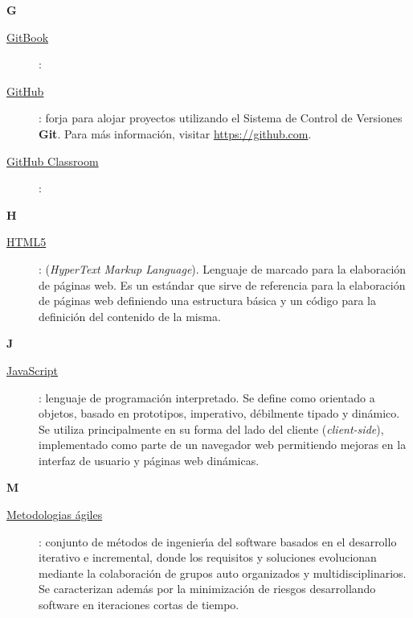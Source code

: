 {\bfseries {\Huge G}}\label{Apendice1:G}
\bigskip
\bigskip

\begin{description}
  \item[\underline{GitBook}\label{apend1:gitbook}]: 
  \bigskip
\end{description}

\begin{description}
  \item[\underline{GitHub}\label{apend1:github}]: forja para alojar proyectos utilizando el Sistema de Control de Versiones {\bfseries Git}. Para m\'as informaci\'on, visitar {\small 
  \url{https://github.com}}.
  \bigskip
\end{description}

\begin{description}
  \item[\underline{GitHub Classroom}\label{apend1:github-classroom}]:
  \bigskip
\end{description}

\bigskip
{\bfseries {\Huge H}}\label{Apendice1:H}
\bigskip
\bigskip

\begin{description}
  \item[\underline{HTML5}\label{apend1:html}]: (\textit{HyperText Markup Language}). Lenguaje de marcado para la elaboraci\'on de p\'aginas web. Es un est\'andar que sirve de referencia para la 
  elaboraci\'on de p\'aginas web definiendo una estructura b\'asica y un c\'odigo para la definici\'on del contenido de la misma.
  \bigskip
\end{description}

\bigskip
\newpage

{\bfseries {\Huge J}}\label{Apendice1:J}
\bigskip
\bigskip

\begin{description}
  \item[\underline{JavaScript}\label{apend1:js}]: lenguaje de programaci\'on interpretado. Se define como orientado a objetos, basado en prototipos, imperativo, d\'ebilmente tipado y 
  din\'amico. Se utiliza principalmente en su forma del lado del cliente (\textit{client-side}), implementado como parte de un navegador web permitiendo mejoras en la interfaz de usuario y p\'aginas 
web din\'amicas.
  \bigskip
\end{description}

\bigskip
{\bfseries {\Huge M}}\label{Apendice1:M}
\bigskip
\bigskip

\begin{description}
  \item[\underline{Metodologias \'agiles}\label{apend1:ma}]: conjunto de m\'etodos de ingenier\'{\i}a del software basados en el desarrollo iterativo e incremental, donde los requisitos y 
  soluciones evolucionan mediante la colaboraci\'on de grupos auto organizados y multidisciplinarios. Se caracterizan adem\'as por la minimizaci\'on de riesgos desarrollando software en
  iteraciones cortas de tiempo.
  \bigskip
\end{description}


